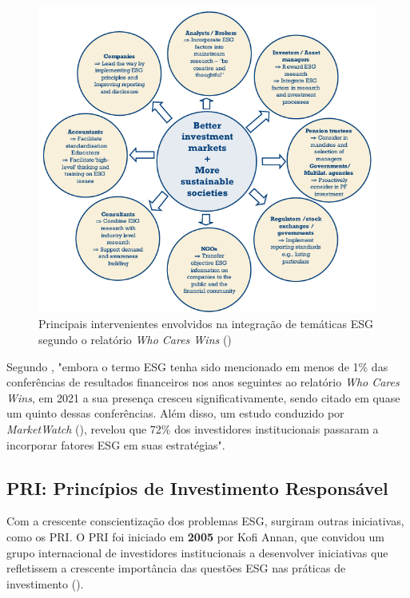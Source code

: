 \begin{figure}[htbp]
    \centering
    \includegraphics[width=5in,keepaspectratio]{frontmatter/assets/agentes-chave-esg-wcw.png}
    \caption{Principais intervenientes envolvidos na integração de temáticas \gls{ESG} segundo o relatório \textit{Who Cares Wins} (\cite{onValues2005})}
    \label{fig:wcwactors}
\end{figure}

Segundo \cite{Pollman2024}, "embora o termo \gls{ESG} tenha sido mencionado em menos de 1\% das conferências de resultados financeiros nos anos seguintes ao relatório \textit{Who Cares Wins}, em 2021 a sua presença cresceu significativamente, sendo citado em quase um quinto dessas conferências. Além disso, um estudo conduzido por \textit{MarketWatch} (\cite{Carlson2021}), revelou que 72\% dos investidores institucionais passaram a incorporar fatores \gls{ESG} em suas estratégias".

\subsection{PRI: Princípios de Investimento Responsável}
\label{subsec: PRI}

Com a crescente conscientização dos problemas \gls{ESG}, surgiram outras iniciativas, como os \gls{PRI}. O \gls{PRI} foi iniciado em \textbf{2005} por Kofi Annan, que convidou um grupo internacional de investidores institucionais a desenvolver iniciativas que refletissem a crescente importância das questões \gls{ESG} nas práticas de investimento (\cite{Kim2022}).

